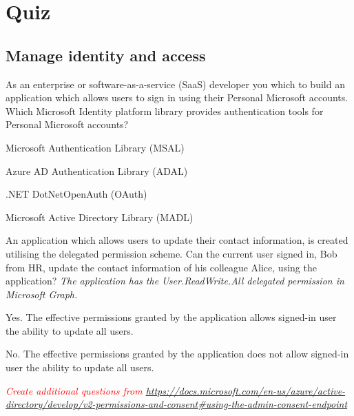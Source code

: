 \section{Quiz}
\subsection{Manage identity and access}
As an enterprise or software-as-a-service (SaaS) developer you which to build an application which allows users to sign in using their Personal Microsoft accounts. Which Microsoft Identity platform library provides authentication tools for Personal Microsoft accounts?
\begin{todolist}
\item Microsoft Authentication Library (MSAL)
\item Azure AD Authentication Library (ADAL)
\item .NET DotNetOpenAuth (OAuth)
\item Microsoft Active Directory Library (MADL)
\end{todolist}
An application which allows users to update their contact information, is created utilising the delegated permission scheme. Can the current user signed in, Bob from HR, update the contact information of his colleague Alice, using the application? \textit{The application has the User.ReadWrite.All delegated permission in Microsoft Graph.}
\begin{todolist}
\item Yes. The effective permissions granted by the application allows signed-in user the ability to update all users.
\item No. The effective permissions granted by the application does not allow signed-in user the ability to update all users.
\end{todolist}

\vspace{1cm}
\textcolor{red}{\textit{Create additional questions from \href{https://docs.microsoft.com/en-us/azure/active-directory/develop/v2-permissions-and-consent\#using-the-admin-consent-endpoint}{https://docs.microsoft.com/en-us/azure/active-directory/develop/v2-permissions-and-consent\#using-the-admin-consent-endpoint}}}